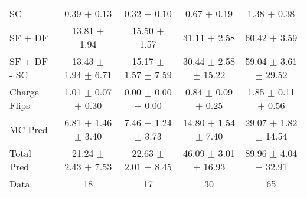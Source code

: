 \begin{tabular}{l|cccc}
                                 SC &  0.39 $\pm$  0.13 &  0.32 $\pm$  0.10 &  0.67 $\pm$  0.19 &  1.38 $\pm$  0.38 \\
                            SF + DF & 13.81 $\pm$  1.94 & 15.50 $\pm$  1.57 & 31.11 $\pm$  2.58 & 60.42 $\pm$  3.59 \\
\hline
                       SF + DF - SC & 13.43 $\pm$  1.94 $\pm$  6.71 & 15.17 $\pm$  1.57 $\pm$  7.59 & 30.44 $\pm$  2.58 $\pm$ 15.22 & 59.04 $\pm$  3.61 $\pm$ 29.52 \\
\hline\hline
                       Charge Flips &  1.01 $\pm$  0.07 $\pm$  0.30 &  0.00 $\pm$  0.00 $\pm$  0.00 &  0.84 $\pm$  0.09 $\pm$  0.25 &  1.85 $\pm$  0.11 $\pm$  0.56 \\
\hline
                            MC Pred &  6.81 $\pm$  1.46 $\pm$  3.40 &  7.46 $\pm$  1.24 $\pm$  3.73 & 14.80 $\pm$  1.54 $\pm$  7.40 & 29.07 $\pm$  1.82 $\pm$ 14.54 \\
\hline
                         Total Pred & 21.24 $\pm$  2.43 $\pm$  7.53 & 22.63 $\pm$  2.01 $\pm$  8.45 & 46.09 $\pm$  3.01 $\pm$ 16.93 & 89.96 $\pm$  4.04 $\pm$ 32.91 \\
\hline\hline
                               Data &    18 &    17 &    30 &    65 \\
\hline\hline
\end{tabular}

